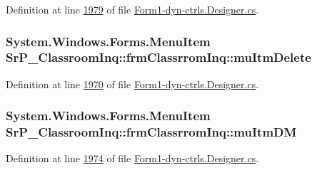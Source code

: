 \-Definition at line \hyperlink{_form1-dyn-ctrls_8_designer_8cs_source_l01979}{1979} of file \hyperlink{_form1-dyn-ctrls_8_designer_8cs_source}{\-Form1-\/dyn-\/ctrls.\-Designer.\-cs}.

\hypertarget{class_sr_p___classroom_inq_1_1frm_classrrom_inq_afb6bae444aa0f2084f3d447454a29e47}{
\subsubsection[{mu\-Itm\-Delete}]{\setlength{\rightskip}{0pt plus 5cm}\-System.\-Windows.\-Forms.\-Menu\-Item {\bf \-Sr\-P\-\_\-\-Classroom\-Inq\-::frm\-Classrrom\-Inq\-::mu\-Itm\-Delete}}}
\label{class_sr_p___classroom_inq_1_1frm_classrrom_inq_afb6bae444aa0f2084f3d447454a29e47}


\-Definition at line \hyperlink{_form1-dyn-ctrls_8_designer_8cs_source_l01970}{1970} of file \hyperlink{_form1-dyn-ctrls_8_designer_8cs_source}{\-Form1-\/dyn-\/ctrls.\-Designer.\-cs}.

\hypertarget{class_sr_p___classroom_inq_1_1frm_classrrom_inq_a1ab66b5e5506390fd7dab2fae510c610}{
\subsubsection[{mu\-Itm\-D\-M}]{\setlength{\rightskip}{0pt plus 5cm}\-System.\-Windows.\-Forms.\-Menu\-Item {\bf \-Sr\-P\-\_\-\-Classroom\-Inq\-::frm\-Classrrom\-Inq\-::mu\-Itm\-D\-M}}}
\label{class_sr_p___classroom_inq_1_1frm_classrrom_inq_a1ab66b5e5506390fd7dab2fae510c610}


\-Definition at line \hyperlink{_form1-dyn-ctrls_8_designer_8cs_source_l01974}{1974} of file \hyperlink{_form1-dyn-ctrls_8_designer_8cs_source}{\-Form1-\/dyn-\/ctrls.\-Designer.\-cs}.

